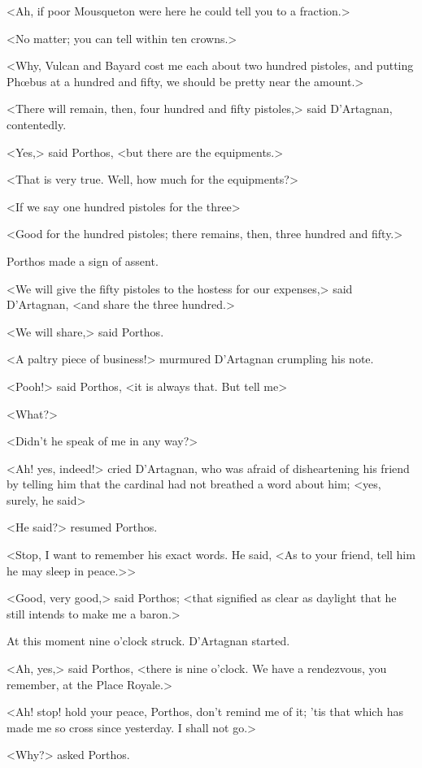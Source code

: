 <Ah, if poor Mousqueton were here he could tell you to a fraction.>

<No matter; you can tell within ten crowns.>

<Why, Vulcan and Bayard cost me each about two hundred pistoles, and putting Phœbus at a hundred and fifty, we should be pretty near the amount.>

<There will remain, then, four hundred and fifty pistoles,> said D'Artagnan, contentedly.

<Yes,> said Porthos, <but there are the equipments.>

<That is very true. Well, how much for the equipments?>

<If we say one hundred pistoles for the three\longdash>

<Good for the hundred pistoles; there remains, then, three hundred and fifty.>

Porthos made a sign of assent.

<We will give the fifty pistoles to the hostess for our expenses,> said D'Artagnan, <and share the three hundred.>

<We will share,> said Porthos.

<A paltry piece of business!> murmured D'Artagnan crumpling his note.

<Pooh!> said Porthos, <it is always that. But tell me\longdash>

<What?>

<Didn't he speak of me in any way?>

<Ah! yes, indeed!> cried D'Artagnan, who was afraid of disheartening his friend by telling him that the cardinal had not breathed a word about him; <yes, surely, he said\longdash>

<He said?> resumed Porthos.

<Stop, I want to remember his exact words. He said, <As to your friend, tell him he may sleep in peace.>>

<Good, very good,> said Porthos; <that signified as clear as daylight that he still intends to make me a baron.>

At this moment nine o'clock struck. D'Artagnan started.

<Ah, yes,> said Porthos, <there is nine o'clock. We have a rendezvous, you remember, at the Place Royale.>

<Ah! stop! hold your peace, Porthos, don't remind me of it; 'tis that which has made me so cross since yesterday. I shall not go.>

<Why?> asked Porthos.

